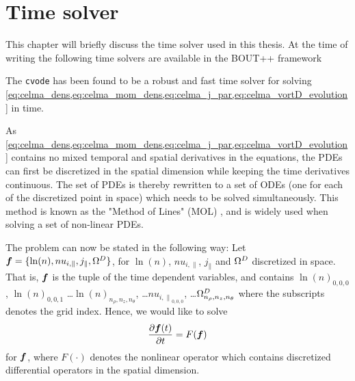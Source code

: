 \section{Time solver}
This chapter will briefly discuss the time solver used in this thesis.
At the time of writing the following time solvers are available in the BOUT++ framework

The \texttt{cvode}\cite{Hindmarsh2012book} has been found to be a robust and fast time solver for solving \cref{eq:celma_dens,eq:celma_mom_dens,eq:celma_j_par,eq:celma_vortD_evolution} in time.

As \cref{eq:celma_dens,eq:celma_mom_dens,eq:celma_j_par,eq:celma_vortD_evolution} contains no mixed temporal and spatial derivatives in the equations, the PDEs can first be discretized in the spatial dimension while keeping the time derivatives continuous.
The set of PDEs is thereby rewritten to a set of ODEs (one for each of the discretized point in space) which needs to be solved simultaneously.
This method is known as the "Method of Lines" (MOL) \cite{Leveque2007book}, and is widely used when solving a set of non-linear PDEs.

The problem can now be stated in the following way:
Let $\boldsymbol{f} = \{\ln(n), nu_{i,\|}, j_\|, \Omega^D\}$, for $\ln(n)$, $nu_{i,\|}$, $j_\|$ and $\Omega^D$ discretized in space.
That is, $\boldsymbol{f}$ is the tuple of the time dependent variables, and contains $\ln(n)_{0,0,0}$, $\ln(n)_{0,0,1}$ \ldots $\ln(n)_{n_\rho,n_z,n_\theta}$, \ldots $nu_{{i,\|}_{0,0,0}}$, \ldots $\Omega^D_{n_\rho,n_z,n_\theta}$ where the subscripts denotes the grid index.
Hence, we would like to solve
%
\begin{align}
    \frac{\partial {\boldsymbol{f}(t)}}{\partial{t}} = F(\boldsymbol{f})
    \label{eq:MOL}
\end{align}
%
for $\boldsymbol{f}$, where $F(\cdot)$ denotes the nonlinear operator which contains discretized differential operators in the spatial dimension.

